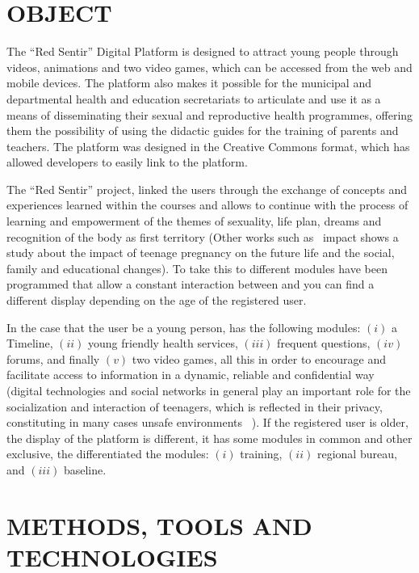 \documentclass[journal,transmag]{IEEEtran}
\begin{document}
\section{OBJECT}\label{sec:propositos}

The ``Red Sentir'' Digital Platform is designed to attract young people through videos, animations and two video games, which can be accessed from the web and mobile devices. The platform also makes it possible for the municipal and departmental health and education secretariats to articulate and use it as a means of disseminating their sexual and reproductive health programmes, offering them the possibility of using the didactic guides for the training of parents and teachers. The platform was designed in the Creative Commons format, which has allowed developers to easily link to the platform.

The ``Red Sentir'' project, linked the users through the exchange of concepts and experiences learned within the courses and allows to continue with the process of learning and empowerment of the themes of sexuality, life plan, dreams and recognition of the body as first territory (Other works such as~\cite{zeck2007impact} impact shows a study about the impact of teenage pregnancy on the future life and the social, family and educational changes). To take this to different modules have been programmed that allow a constant interaction between and you can find a different display depending on the age of the registered user.

In the case that the user be a young person, has the following modules: $(i)$ a Timeline, $(ii)$ young friendly health services, $(iii)$ frequent questions, $(iv)$ forums, and finally $(v)$ two video games, all this in order to encourage and facilitate access to information in a dynamic, reliable and confidential way (digital technologies and social networks in general play an important role for the socialization and interaction of teenagers, which is reflected in their privacy, constituting in many cases unsafe environments ~\cite{hasinoff2013sexting, boyd2007youth}). If the registered user is older, the display of the platform is different, it has some modules in common and other exclusive, the differentiated the modules: $(i)$ training, $(ii)$ regional bureau, and $(iii)$ baseline.

\section{METHODS, TOOLS AND TECHNOLOGIES}\label{sec:herramientas}
\end{document}
